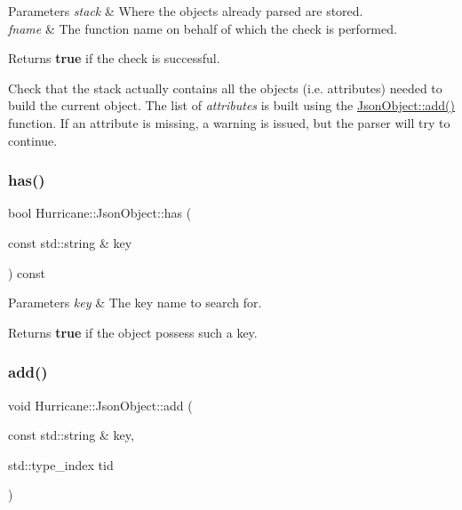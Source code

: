\begin{DoxyParams}{Parameters}
{\em stack} & Where the objects already parsed are stored. \\
\hline
{\em fname} & The function name on behalf of which the check is performed. \\
\hline
\end{DoxyParams}
\begin{DoxyReturn}{Returns}
{\bfseries true} if the check is successful.
\end{DoxyReturn}
Check that the {\ttfamily stack} actually contains all the objects (i.\+e. attributes) needed to build the current object. The list of {\itshape attributes} is built using the \mbox{\hyperlink{classHurricane_1_1JsonObject_a39ed04c118b19f1b6010b7f3336c360f}{Json\+Object\+::add()}} function. If an attribute is missing, a warning is issued, but the parser will try to continue. \mbox{\label{classHurricane_1_1JsonObject_ac0b8816eab2cbcabf18d5421a59aa780}} 
\subsubsection{\texorpdfstring{has()}{has()}}
{\footnotesize\ttfamily bool Hurricane\+::\+Json\+Object\+::has (\begin{DoxyParamCaption}\item[{const std\+::string \&}]{key }\end{DoxyParamCaption}) const}


\begin{DoxyParams}{Parameters}
{\em key} & The key name to search for. \\
\hline
\end{DoxyParams}
\begin{DoxyReturn}{Returns}
{\bfseries true} if the object possess such a key. 
\end{DoxyReturn}
\mbox{\label{classHurricane_1_1JsonObject_a39ed04c118b19f1b6010b7f3336c360f}} 
\subsubsection{\texorpdfstring{add()}{add()}}
{\footnotesize\ttfamily void Hurricane\+::\+Json\+Object\+::add (\begin{DoxyParamCaption}\item[{const std\+::string \&}]{key,  }\item[{std\+::type\+\_\+index}]{tid }\end{DoxyParamCaption})}


